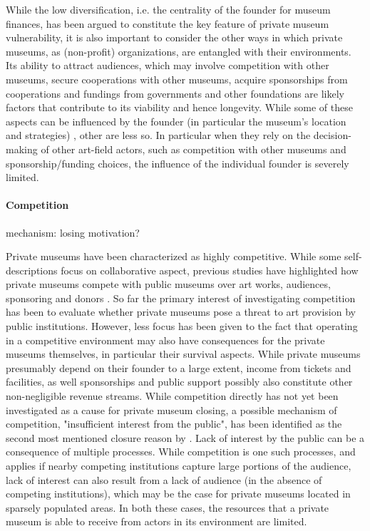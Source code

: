 \documentclass[12pt]{article}
\begin{document}
While the low diversification, i.e. the centrality of the founder for museum finances, has been argued to constitute the key feature of private museum vulnerability, it is also important to consider the other ways in which private museums, as (non-profit) organizations, are entangled with their environments.
Its ability to attract audiences, which may involve competition with other museums, secure cooperations with other museums, acquire sponsorships from cooperations and fundings from governments and other foundations are likely factors that contribute to its viability and hence longevity.
While some of these aspects can be influenced by the founder (in particular the museum's location and strategies) , other are less so.
In particular when they rely on the decision-making of other art-field actors, such as competition with other museums and sponsorship/funding choices, the influence of the individual founder is severely limited.
\paragraph*{Competition}




mechanism: losing motivation?


Private museums have been characterized as highly competitive.
While some self-descriptions focus on collaborative aspect, previous studies have highlighted how private museums compete with public museums over art works, audiences, sponsoring and donors \parencite[p.4]{Kolbe_etal_2022_privatemuseum}. 
So far the primary interest of investigating competition has been to evaluate whether private museums pose a threat to art provision by public institutions.
However, less focus has been given to the fact that operating in a competitive environment may also have consequences for the private museums themselves, in particular their survival aspects.
While private museums presumably depend on their founder to a large extent, income from tickets and facilities, as well sponsorships and public support possibly also constitute other non-negligible revenue streams.
While competition directly has not yet been investigated as a cause for private museum closing, a possible mechanism of competition, "insufficient interest from the public", has been identified as the second most mentioned closure reason by \textcite[p.6]{Velthuis_Gera_2024_fragility}. 
Lack of interest by the public can be a consequence of multiple processes.
While competition is one such processes, and applies if nearby competing institutions capture large portions of the audience, lack of interest can also result from a lack of audience (in the absence of competing institutions), which may be the case for private museums located in sparsely populated areas.
In both these cases, the resources that a private museum is able to receive from actors in its environment are limited. 
\end{document}
